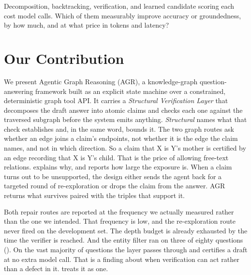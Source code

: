 Decomposition, backtracking, verification, and learned candidate scoring each
cost model calls. Which of them measurably improve accuracy or groundedness, by
how much, and at what price in tokens and latency?

\section{Our Contribution}\label{sec:contribution}

We present Agentic Graph Reasoning (AGR), a knowledge-graph question-answering
framework built as an explicit state machine over a constrained, deterministic
graph tool API. It carries a \emph{Structural Verification Layer} that
decomposes the draft answer into atomic claims and checks each one against the
traversed subgraph before the system emits anything. \emph{Structural} names
what that check establishes and, in the same word, bounds it. The two graph
routes ask whether an edge joins a claim's endpoints, not whether it is the edge
the claim names, and not in which direction. So a claim that X is Y's mother is
certified by an edge recording that X is Y's child. That is the price of
allowing free-text relations.  explains why, and
reports how large the exposure is. When a claim turns out to be unsupported, the
design either sends the agent back for a targeted round of re-exploration or
drops the claim from the answer. AGR returns what survives paired with the
triples that support it.

Both repair routes are reported at the frequency we actually measured rather
than the one we intended. That frequency is low, and the re-exploration route
never fired on the development set. The depth budget is already exhausted by the
time the verifier is reached. And the entity filter ran on three of eighty
questions (). On the vast majority of questions the
layer passes through and certifies a draft at no extra model call. That is a
finding about when verification can act rather than a defect in it.
 treats it as one.

